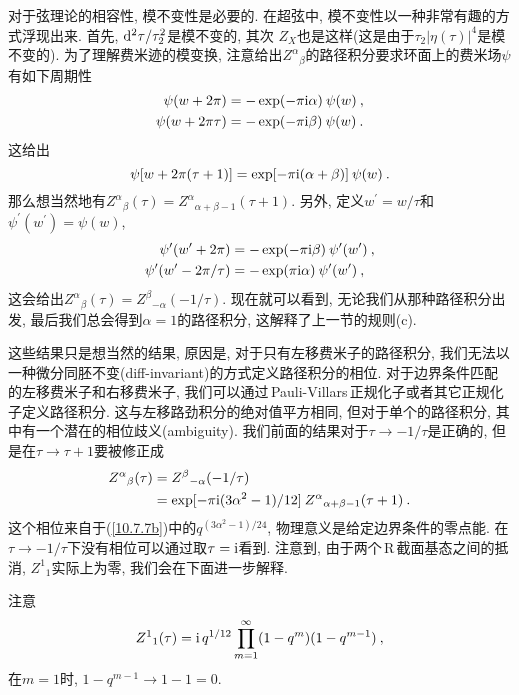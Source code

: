 对于弦理论的相容性, 模不变性是必要的. 在超弦中, 模不变性以一种非常有趣的方式浮现出来. 首先, $\mathrm{d}^{2}\tau/\tau_{2}^{2} $是模不变的, 其次 $Z_{X} $也是这样(这是由于$ \tau_{2}\lvert\eta(\tau)\rvert^{4} $是模不变的). 为了理解费米迹的模变换, 注意给出$ Z^{\alpha}{}_{\beta} $的路径积分要求环面上的费米场$ \psi $有如下周期性
\begin{subequations}
    \begin{align}
        \psi(w+2\pi)&= -\exp(-\pi\mathrm{i}\alpha)\: \psi(w) \:, \label{10.7.11a} \\
        \psi(w+2\pi \tau)&= -\exp(-\pi\mathrm{i}\beta)\:\psi(w) \:. \label{10.7.11b}
    \end{align} \label{10.7.11}
\end{subequations}
这给出
\begin{equation}
    \psi[w+2\pi(\tau+1)] = \exp [-\pi\mathrm{i}(\alpha+\beta)]\:\psi(w) \:. \label{10.7.12}
\end{equation}
那么想当然地有$ Z^{\alpha}{}_{\beta}(\tau)=Z^{\alpha}{}_{\alpha+\beta-1}(\tau+1)$. 另外, 定义$ w^{\prime}=w/\tau $和$ \psi^{\prime}(w^{\prime})=\psi(w)$,
\begin{subequations}
    \begin{align}
        \psi^{\prime}(w^{\prime}+2\pi)&= -\exp(-\pi\mathrm{i}\beta)\: \psi^{\prime}(w^{\prime}) \:, \label{10.7.13a} \\
        \psi^{\prime}(w^{\prime}-2\pi/\tau)&= -\exp(\pi\mathrm{i}\alpha)\:\psi^{\prime}(w^{\prime}) \:, \label{10.7.13b}
    \end{align} \label{10.7.13}
\end{subequations}
这会给出$ Z^{\alpha}{}_{\beta}(\tau) = Z^{\beta}{}_{-\alpha}(-1/\tau)$. 现在就可以看到, 无论我们从那种路径积分出发, 最后我们总会得到$ \alpha=1 $的路径积分, 这解释了上一节的规则(c).

这些结果只是想当然的结果, 原因是, 对于只有左移费米子的路径积分, 我们无法以一种微分同胚不变(diff-invariant)的方式定义路径积分的相位. 对于边界条件匹配的左移费米子和右移费米子, 我们可以通过\,Pauli-Villars\,正规化子或者其它正规化子定义路径积分. 这与左移路劲积分的绝对值平方相同, 但对于单个的路径积分, 其中有一个潜在的相位歧义(ambiguity). 我们前面的结果对于$ \tau\to-1/\tau $是正确的, 但是在$ \tau\to\tau+1 $要被修正成
\begin{align}
    Z^{\alpha}{}_{\beta}(\tau) &= Z^{\beta}{}_{-\alpha}(-1/\tau) \nonumber\\
    &= \exp[-\pi\mathrm{i}(3\alpha^{2}-1)/12]\:Z^{\alpha}{}_{\alpha+\beta-1}(\tau+1)\:. \label{10.7.14}
\end{align}
这个相位来自于(\ref{10.7.7b})中的$ q^{(3\alpha^{2}-1)/24}$, 物理意义是给定边界条件的零点能. 在$ \tau\to-1/\tau $下没有相位可以通过取$ \tau=\mathrm{i} $看到. 注意到, 由于两个\,R\,截面基态之间的抵消, $Z^{1}{}_{1} $实际上为零, 我们会在下面进一步解释.
\begin{tcolorbox}
注意
\[
Z^{1}{}_{1}(\tau) = \mathrm{i}\,q^{1/12}\prod_{m=1}^{\infty}(1-q^{m})(1-q^{m-1}) \:,
\]
在$ m=1 $时, $1-q^{m-1}\to 1-1 =0$.
\end{tcolorbox}

